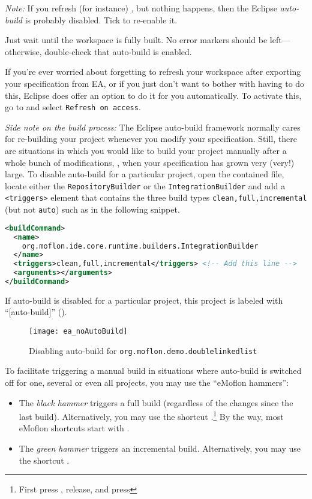 \begin{stepbystep}
\emph{Note:} If you refresh (for instance) , but nothing happens, then the Eclipse \emph{auto-build} is probably disabled.
Tick  to re-enable it.
%
\item
Just wait until the workspace is fully built.
No error markers should be left---otherwise, double-check that auto-build is enabled.
%
\item
If you're ever worried about forgetting to refresh your workspace after exporting your specification from EA, or if you just don't want to bother with having to do this,
Eclipse does offer an option to do it for you automatically. To activate this, go to  and select \texttt{Refresh on access}.

\end{stepbystep}

\emph{Side note on the build process:}
The Eclipse auto-build framework normally cares for re-building your project whenever you modify your specification.
Still, there are situations in which you would like to build your project manually after a whole bunch of modifications, \eg, when your specification has grown very (very!) large.
To disable auto-build for a particular project, open the contained  file, locate either the \texttt{RepositoryBuilder} or the \texttt{IntegrationBuilder} and add a \texttt{<triggers>} element that contains the three build types \texttt{clean,full,incremental} (but not \texttt{auto}) such as in the following snippet.
\begin{lstlisting}[language=XML]
<buildCommand>
  <name>
    org.moflon.ide.core.runtime.builders.IntegrationBuilder
  </name>
  <triggers>clean,full,incremental</triggers> <!-- Add this line -->
  <arguments></arguments>
</buildCommand>
\end{lstlisting}
If auto-build is disabled for a particular project, this project is labeled with \enquote{[auto-build]} ().
%
\begin{figure}[htbp]
    \centering
    \texttt{[image: ea\_noAutoBuild]}
    \caption{Disabling auto-build for \texttt{org.moflon.demo.doublelinkedlist}} 
    \label{ea:noAutoBuild} 
\end{figure}
To facilitate triggering a manual build in situations where auto-build is switched off for one, several or even all projects, you may use the \enquote{eMoflon hammers}:
\begin{itemize}[*]
    \item
    The \emph{black hammer} \eMoflonFullBuildIcon triggers a full build (regardless of the changes since the last build).
    Alternatively, you may use the shortcut \linebreak {}.\footnote{First press , release, and press }
    By the way, most eMoflon shortcuts start with \linebreak{}.
    \item 
    The \emph{green hammer} \eMoflonIncrementalBuildIcon triggers an incremental build.
    Alternatively, you may use the shortcut .
\end{itemize}